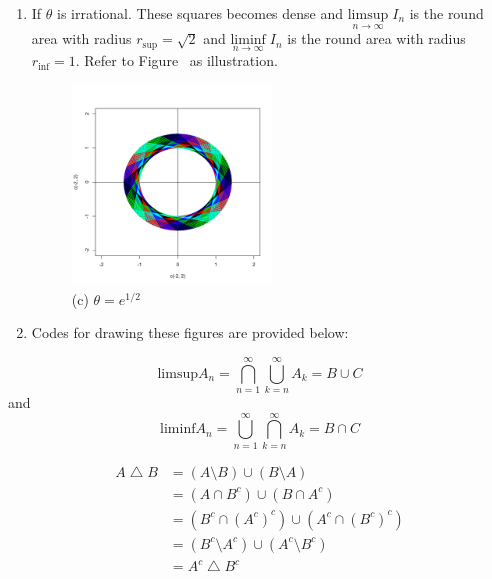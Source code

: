 \begin{list}{1.9.}{}
\begin{enumerate}
  \item If $\theta$ is irrational. These squares becomes dense and $ \underset{n\to\infty}{\mathrm{limsup}}\;I_n$ is the round area with radius $r_{\mathrm{sup}}= \sqrt{2}$ and $ \underset{n\to\infty}{\mathrm{liminf}}\;I_n$ is the round area with radius $r_{\mathrm{inf}} = 1$. Refer to Figure~ as illustration.
    \begin{figure}[htbp]
      \centering
      \includegraphics[width=0.5\textwidth]{./Figures/1_9_7_c.pdf}
      \caption{(c) $\theta = e^{1/2}$}
      \label{fig:1.9.7.c}
    \end{figure}
  \item Codes for drawing these figures are provided below:
    
  \end{enumerate}

  
\item
  \[
    \mathrm{limsup}A_n = \bigcap\limits_{n=1}^\infty\bigcup\limits_{k=n}^\infty A_k = B \cup C
  \]
  and
  \[
    \mathrm{liminf}A_n = \bigcup\limits_{n=1}^\infty\bigcap\limits_{k=n}^\infty A_k = B \cap C
  \]

  
\item
  \[
    \begin{aligned}
      A \bigtriangleup B &= \left(A \setminus B\right) \cup \left(B \setminus A\right)    \\
      & = \left(A \cap B^c \right) \cup \left(B \cap A^c \right)    \\
      & = \left(B^c \cap \left(A^c\right)^c \right) \cup \left(A^c \cap \left(B^c\right)^c \right)    \\
      & = \left(B^c \setminus A^c \right) \cup \left(A^c \setminus B^c \right)    \\
      & = A^c \bigtriangleup B^c
    \end{aligned}
  \]


\end{list}
